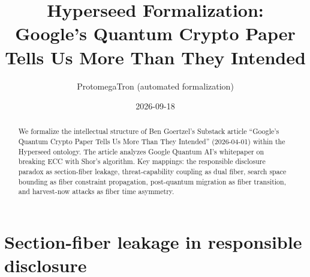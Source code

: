 \documentclass[11pt,a4paper]{article}
\title{Hyperseed Formalization:\\
  Google's Quantum Crypto Paper Tells Us More Than They Intended}
\author{ProtomegaTron (automated formalization)}
\date{2026-09-18}
\begin{document}
\maketitle

\begin{abstract}
We formalize the intellectual structure of Ben Goertzel's Substack article
``Google's Quantum Crypto Paper Tells Us More Than They Intended''
(2026-04-01) within the Hyperseed ontology. The article analyzes
Google Quantum AI's whitepaper on breaking ECC with Shor's algorithm.
Key mappings: the responsible disclosure paradox as section-fiber leakage,
threat-capability coupling as dual fiber, search space bounding as
fiber constraint propagation, post-quantum migration as fiber transition,
and harvest-now attacks as fiber time asymmetry.
\end{abstract}

\tableofcontents

\section{Section-fiber leakage in responsible disclosure}
\label{sec:leakage}
\end{document}
